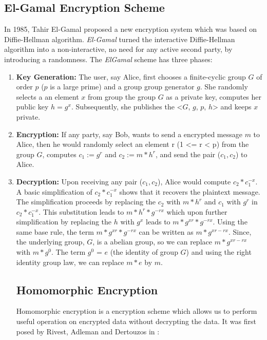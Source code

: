      \subsection{El-Gamal Encryption Scheme}
     \label{sec:elgamal}
     In 1985, Tahir El-Gamal \citep{elgamal1985public} proposed a new encryption system which was based on Diffie-Hellman algorithm. 
     \textit{El-Gamal} turned the interactive  Diffie-Hellman algorithm into a non-interactive, no need for any active second party, by introducing 
     a randomness.  The \textit{ElGamal} scheme has three phases:
     \begin{enumerate}
		\item \textbf{Key Generation:}   
		The user, say Alice, first chooses a finite-cyclic group $G$ of order $p$ ($p$ is a large prime) and a group group generator $g$.
		She randomly selects a an element $x$ from group the group $G$ as a private key, computes her public key $h = g^{x}$. 
		Subsequently, she publishes 
		the <$G$, $g$, $p$, $h$> and keeps $x$ private. 
		\item \textbf{Encryption:}
		If any party, say Bob, wants to send a encrypted message $m$ to Alice, then he would randomly select an element 
		r  (1 <= r < p) from the group $G$, computes $c_{1} := g^{r}$ and $c_{2} := m * h^{r}$, and send the pair ($c_{1}, c_{2}$) to 
		Alice. 
		\item \textbf{Decryption:}
		Upon receiving any pair ($c_{1}, c_{2}$), Alice would compute $c_{2} * c_{1}^{-x}$. A basic simplification of $c_{2} * c_{1}^{-x}$
		shows that it recovers the plaintext message. The simplification proceeds by replacing the $c_{2}$ with 
		$m*h^{r}$ and $c_{1}$ with $g^{r}$ in $c_{2} * c_{1}^{-x}$. This substitution leads to 
		$m * h ^ {r} * g^{-rx}$ which upon further simplification by replacing the $h$ with $g^{x}$
		leads to $m * g^{xr} * g^{-rx}$. Using the same base rule, the term $m * g^{xr} * g^{-rx}$ can be 
		written as $m * g^{xr - rx}$. Since, the underlying group, $G$, is a abelian group, so we 
		can replace $m * g^{xr - rx}$ with $m * g^{0}$. The term $g^{0}$  = $e$ (the identity of group $G$) and using 
		the right identity group law, we can replace $m * e$ by $m$. 
		
		
    
    \subsection{Homomorphic Encryption}
    \label{sec:homomorphic-enc}
	     Homomorphic encryption  is a encryption scheme which allows us to perform useful operation on 
	     encrypted data without decrypting the data.
	     It was first posed by Rivest, Adleman and Dertouzos in \citep{rivest1978data}: 
	     \begin{displayquote}
	     

\end{displayquote}
\end{enumerate}
